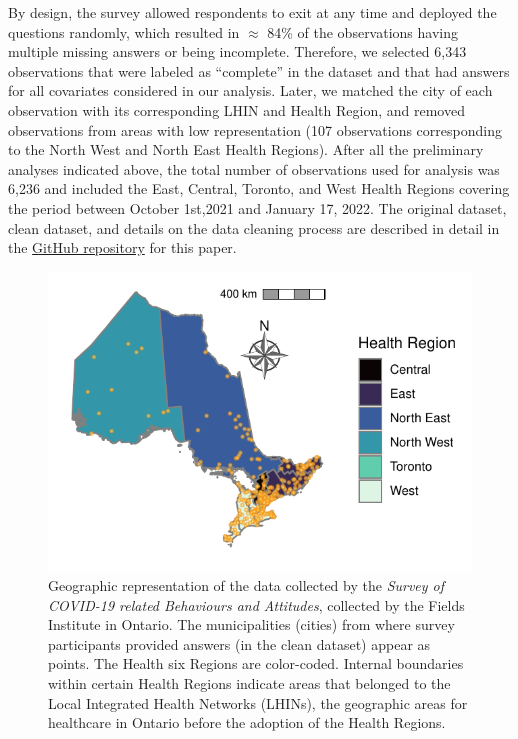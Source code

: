 \documentclass[
  letterpaper,
  DIV=11,
  numbers=noendperiod]{scrartcl}
\begin{document}
By design, the survey allowed respondents to exit at any time and
deployed the questions randomly, which resulted in \(\approx\) 84\% of
the observations having multiple missing answers or being incomplete.
Therefore, we selected 6,343 observations that were labeled as
``complete'' in the dataset and that had answers for all covariates
considered in our analysis. Later, we matched the city of each
observation with its corresponding LHIN and Health Region, and removed
observations from areas with low representation (107 observations
corresponding to the North West and North East Health Regions). After
all the preliminary analyses indicated above, the total number of
observations used for analysis was 6,236 and included the East, Central,
Toronto, and West Health Regions covering the period between October
1st,2021 and January 17, 2022. The original dataset, clean dataset, and
details on the data cleaning process are described in detail in the
\href{https://github.com/aimundo/Fields_COVID-19/}{GitHub repository}
for this paper.

\begin{figure}

{\centering \includegraphics{../data/map_data/map.pdf}

}

\caption{\label{fig-map}Geographic representation of the data collected
by the \emph{Survey of COVID-19 related Behaviours and Attitudes},
collected by the Fields Institute in Ontario. The municipalities
(cities) from where survey participants provided answers (in the clean
dataset) appear as points. The Health six Regions are color-coded.
Internal boundaries within certain Health Regions indicate areas that
belonged to the Local Integrated Health Networks (LHINs), the geographic
areas for healthcare in Ontario before the adoption of the Health
Regions.}

\end{figure}
\end{document}
